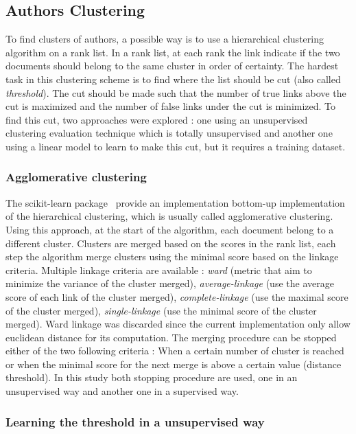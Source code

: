 \subsection{Authors Clustering \label{sec:authors_clustering}}

To find clusters of authors, a possible way is to use a hierarchical clustering algorithm on a rank list.
In a rank list, at each rank the link indicate if the two documents should belong to the same cluster in order of certainty.
The hardest task in this clustering scheme is to find where the list should be cut (also called \textit{threshold}).
The cut should be made such that the number of true links above the cut is maximized and the number of false links under the cut is minimized.
To find this cut, two approaches were explored : one using an unsupervised clustering evaluation technique which is totally unsupervised and another one using a linear model to learn to make this cut, but it requires a training dataset.

\subsubsection{Agglomerative clustering}

The scikit-learn package~\cite{sklearn} provide an implementation bottom-up implementation of the hierarchical clustering, which is usually called agglomerative clustering.
Using this approach, at the start of the algorithm, each document belong to a different cluster.
Clusters are merged based on the scores in the rank list, each step the algorithm merge clusters using the minimal score based on the linkage criteria.
Multiple linkage criteria are available : \textit{ward} (metric that aim to minimize the variance of the cluster merged), \textit{average-linkage} (use the average score of each link of the cluster merged), \textit{complete-linkage} (use the maximal score of the cluster merged), \textit{single-linkage} (use the minimal score of the cluster merged).
Ward linkage was discarded since the current implementation only allow euclidean distance for its computation.
The merging procedure can be stopped either of the two following criteria : When a certain number of cluster is reached or when the minimal score for the next merge is above a certain value (distance threshold).
In this study both stopping procedure are used, one in an unsupervised way and another one in a supervised way.

\subsubsection{Learning the threshold in a unsupervised way}

